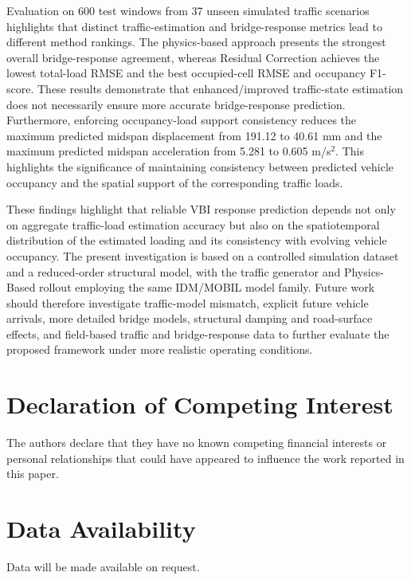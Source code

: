 \documentclass[journal]{IEEEtran}
\begin{document}
Evaluation on 600 test windows from 37 unseen simulated traffic scenarios highlights that distinct traffic-estimation and bridge-response metrics lead to different method rankings. The physics-based approach presents the strongest overall bridge-response agreement, whereas Residual Correction achieves the lowest total-load RMSE and the best occupied-cell RMSE and occupancy F1-score. These results demonstrate that enhanced/improved traffic-state estimation does not necessarily ensure more accurate bridge-response prediction. Furthermore, enforcing occupancy-load support consistency reduces the maximum predicted midspan displacement from 191.12 to 40.61 mm and the maximum predicted midspan acceleration from 5.281 to 0.605 m/s$^2$. This highlights the significance of maintaining consistency between predicted vehicle occupancy and the spatial support of the corresponding traffic loads.

These findings highlight that reliable VBI response prediction depends not only on aggregate traffic-load estimation accuracy but also on the spatiotemporal distribution of the estimated loading and its consistency with evolving vehicle occupancy. The present investigation is based on a controlled simulation dataset and a reduced-order structural model, with the traffic generator and Physics-Based rollout employing the same IDM/MOBIL model family. Future work should therefore investigate traffic-model mismatch, explicit future vehicle arrivals, more detailed bridge models, structural damping and road-surface effects, and field-based traffic and bridge-response data to further evaluate the proposed framework under more realistic operating conditions.

\section*{Declaration of Competing Interest}

The authors declare that they have no known competing financial interests or personal relationships that could have appeared to influence the work reported in this paper.

\section*{Data Availability}

Data will be made available on request.

\FloatBarrier



\end{document}
